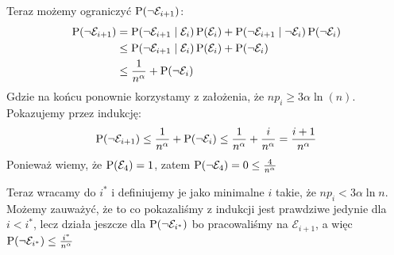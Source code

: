 Teraz możemy ograniczyć \( \prob\pars{\neg\mathcal{E}_{i+1}} \):
\begin{align*}
	\prob\pars{\neg\mathcal{E}_{i+1}} & = \prob\pars{\neg\mathcal{E}_{i+1} \mid \mathcal{E}_i}\prob\pars{\mathcal{E}_i} + \prob\pars{\neg\mathcal{E}_{i+1} \mid \neg\mathcal{E}_i}\prob\pars{\neg\mathcal{E}_i} \\
	                                  & \leq \prob\pars{\neg\mathcal{E}_{i+1} \mid \mathcal{E}_i}\prob\pars{\mathcal{E}_i} + \prob\pars{\neg\mathcal{E}_i}                                                      \\
	                                  & \leq \frac{1}{n^{\alpha}} + \prob\pars{\neg\mathcal{E}_i}
\end{align*}
Gdzie na końcu ponownie korzystamy z założenia, że \( np_i \geq 3\alpha\ln(n) \).
Pokazujemy przez indukcję:
\[
	\prob\pars{\neg\mathcal{E}_{i+1}} \leq \frac{1}{n^{\alpha}} + \prob\pars{\neg\mathcal{E}_i} \leq \frac{1}{n^{\alpha}} + \frac{i}{n^{\alpha}} = \frac{i + 1}{n^{\alpha}}
\]
Ponieważ wiemy, że \(\prob\pars{\mathcal{E}_4} = 1 \), zatem \( \prob\pars{\neg\mathcal{E}_4} = 0 \leq \frac{4}{n^\alpha} \)

Teraz wracamy do \( i^* \) i definiujemy je jako minimalne \( i \) takie, że \( np_i < 3\alpha\ln n \).
Możemy zauważyć, że to co pokazaliśmy z indukcji jest prawdziwe jedynie dla \( i < i^* \), lecz działa jeszcze dla \(\prob\pars{\neg\mathcal{E}_{i^*}}\) bo pracowaliśmy na \(\mathcal{E}_{i + 1}\), a więc \( \prob\pars{\neg\mathcal{E}_{i^*}} \leq \frac{i^*}{n^{\alpha}} \)

